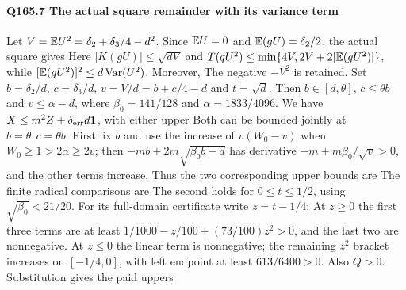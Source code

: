 \paragraph{Q165.7 The actual square remainder with its variance term}\label{part:Q165.7}
Let $V=\allowbreak \mathbb E U^2=\allowbreak \delta_2+\delta_3/4-d^2$.
Since $\mathbb E U=\allowbreak 0$ and $\mathbb E(gU)=\allowbreak \delta_2/2$, the actual square gives
Here $|K(gU)|\le\allowbreak \sqrt{dV}$ and
$T(qU^2)\le\allowbreak \min\{4V,\allowbreak 2V+2|\mathbb E(gU^2)|\}$, while
$[\mathbb E(gU^2)]^2\le\allowbreak  d\operatorname{Var}(U^2)$.
Moreover,
The negative $-V^2$ is retained. Set $b=\allowbreak \delta_2/d$, $c=\allowbreak \delta_3/d$,
$v=\allowbreak V/d=\allowbreak b+c/4-d$ and $t=\allowbreak \sqrt d$. Then
$b\in[d,\allowbreak \theta]$, $c\le\allowbreak \theta b$ and $v\le\allowbreak \alpha-d$, where
$\beta_0=\allowbreak 141/128$ and $\alpha=\allowbreak 1833/4096$.
We have $X\le\allowbreak  m^2Z+\delta_{\rm err}d\mathbf1$, with either upper
Both can be bounded jointly at $b=\allowbreak \theta,\allowbreak c=\allowbreak \theta b$.
First fix $b$ and use the increase of $v(W_0-v)$ when
$W_0\ge\allowbreak 1>\allowbreak 2\alpha\ge\allowbreak 2v$; then
$-mb+2m\sqrt{\beta_0b-d}$ has derivative
$-m+m\beta_0/\sqrt v>\allowbreak 0$, and the other terms increase.
Thus the two corresponding upper bounds are
The finite radical comparisons are
The second holds for $0\le\allowbreak  t\le\allowbreak 1/2$, using
$\sqrt{\beta_0}<\allowbreak 21/20$. For its full-domain certificate write
$z=\allowbreak t-1/4$:
At $z\ge\allowbreak 0$ the first three terms are at least
$1/1000-z/100+(73/100)z^2>\allowbreak 0$, and the last two are nonnegative.
At $z\le\allowbreak 0$ the linear term is nonnegative; the remaining $z^2$ bracket
increases on $[-1/4,\allowbreak 0]$, with left endpoint at least $613/6400>\allowbreak 0$.
Also $Q>\allowbreak 0$. Substitution gives the paid uppers
